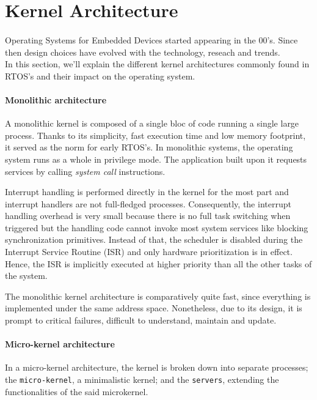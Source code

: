 \section{Kernel Architecture}


\paragraph{}
Operating Systems for Embedded Devices started appearing in the 00's.
Since then design choices have evolved with the technology, reseach and trends.
\\
In this section, we'll explain the different kernel architectures commonly found in RTOS's and their impact on the operating system.

\paragraph{Monolithic architecture}
A monolithic kernel is composed of a single bloc of code running a single large process.
Thanks to its simplicity, fast execution time and low memory footprint, it served as the norm for early RTOS's.
In monolithic systems, the operating system runs as a whole in privilege mode.
The application built upon it requests services by calling \textit{system call} instructions.

Interrupt handling is performed directly in the kernel for the most part and interrupt handlers are not full-fledged processes.
Consequently, the interrupt handling overhead is very small because there is no full task switching when triggered
    but the handling code cannot invoke most system services like blocking synchronization primitives.
Instead of that, the scheduler is disabled during the Interrupt Service Routine (ISR) and only hardware prioritization is in effect.
Hence, the ISR is implicitly executed at higher priority than all the other tasks of the system.

The monolithic kernel architecture is comparatively quite fast, since ev\-ery\-thing is implemented under the same address space.
Nonetheless, due to its design, it is prompt to critical failures, difficult to understand, maintain and update.

\paragraph{Micro-kernel architecture}
In a micro-kernel architecture, the kernel is broken down into separate processes;
     the \texttt{micro-kernel}, a minimalistic kernel;
     and the \texttt{servers}, extending the functionalities of the said microkernel.

